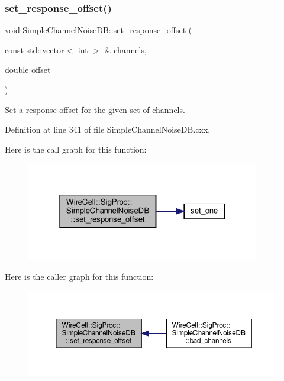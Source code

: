 \subsubsection{\texorpdfstring{set\+\_\+response\+\_\+offset()}{set\_response\_offset()}}
{\footnotesize\ttfamily void Simple\+Channel\+Noise\+D\+B\+::set\+\_\+response\+\_\+offset (\begin{DoxyParamCaption}\item[{const std\+::vector$<$ int $>$ \&}]{channels,  }\item[{double}]{offset }\end{DoxyParamCaption})}



Set a response offset for the given set of channels. 



Definition at line 341 of file Simple\+Channel\+Noise\+D\+B.\+cxx.

Here is the call graph for this function\+:
\nopagebreak
\begin{figure}[H]
\begin{center}
\leavevmode
\includegraphics[width=289pt]{class_wire_cell_1_1_sig_proc_1_1_simple_channel_noise_d_b_adce8a777da71112d25e077a610de2a94_cgraph}
\end{center}
\end{figure}
Here is the caller graph for this function\+:
\nopagebreak
\begin{figure}[H]
\begin{center}
\leavevmode
\includegraphics[width=350pt]{class_wire_cell_1_1_sig_proc_1_1_simple_channel_noise_d_b_adce8a777da71112d25e077a610de2a94_icgraph}
\end{center}
\end{figure}
\mbox{\label{class_wire_cell_1_1_sig_proc_1_1_simple_channel_noise_d_b_a9ede3bdc966580756f9fff4070e8348b}} 
